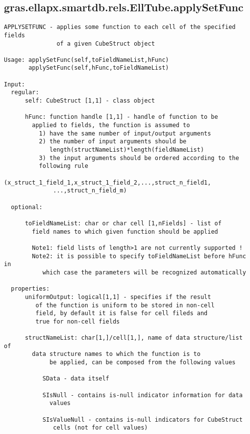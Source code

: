 \subsection{\texorpdfstring{gras.ellapx.smartdb.rels.EllTube.applySetFunc}{applySetFunc}}\label{method:gras.ellapx.smartdb.rels.EllTube.applySetFunc}
\begin{verbatim}
APPLYSETFUNC - applies some function to each cell of the specified fields
               of a given CubeStruct object

Usage: applySetFunc(self,toFieldNameList,hFunc)
       applySetFunc(self,hFunc,toFieldNameList)

Input:
  regular:
      self: CubeStruct [1,1] - class object

      hFunc: function handle [1,1] - handle of function to be
        applied to fields, the function is assumed to
          1) have the same number of input/output arguments
          2) the number of input arguments should be
             length(structNameList)*length(fieldNameList)
          3) the input arguments should be ordered according to the
          following rule
              (x_struct_1_field_1,x_struct_1_field_2,...,struct_n_field1,
              ...,struct_n_field_m)

  optional:

      toFieldNameList: char or char cell [1,nFields] - list of
        field names to which given function should be applied

        Note1: field lists of length>1 are not currently supported !
        Note2: it is possible to specify toFieldNameList before hFunc in
           which case the parameters will be recognized automatically

  properties:
      uniformOutput: logical[1,1] - specifies if the result
         of the function is uniform to be stored in non-cell
         field, by default it is false for cell fileds and
         true for non-cell fields

      structNameList: char[1,]/cell[1,], name of data structure/list of
        data structure names to which the function is to
             be applied, can be composed from the following values

           SData - data itself

           SIsNull - contains is-null indicator information for data
             values

           SIsValueNull - contains is-null indicators for CubeStruct
              cells (not for cell values)


\end{verbatim}
